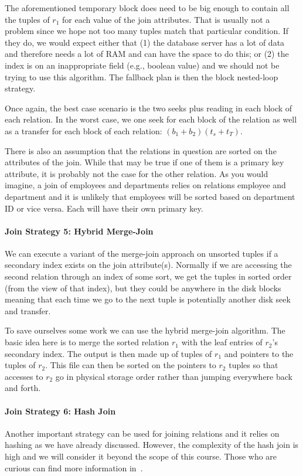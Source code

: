 The aforementioned temporary block does need to be big enough to contain all the tuples of $r_{1}$ for each value of the join attributes. That is usually not a problem since we hope not too many tuples match that particular condition. If they do, we would expect either that (1) the database server has a lot of data and therefore needs a lot of RAM and can have the space to do this; or (2) the index is on an inappropriate field (e.g., boolean value) and we should not be trying to use this algorithm. The fallback plan is then the block nested-loop strategy.

Once again, the best case scenario is the two seeks plus reading in each block of each relation. In the worst case, we one seek for each block of the relation as well as a transfer for each block of each relation: $(b_{1} + b_{2})(t_{s} + t_{T})$.

There is also an assumption that the relations in question are sorted on the attributes of the join. While that may be true if one of them is a primary key attribute, it is probably not the case for the other relation. As you would imagine, a join of employees and departments relies on relations employee and department and it is unlikely that employees will be sorted based on department ID or vice versa. Each will have their own primary key. 

\paragraph{Join Strategy 5: Hybrid Merge-Join}

We can execute a variant of the merge-join approach on unsorted tuples if a secondary index exists on the join attribute(s). Normally if we are accessing the second relation through an index of some sort, we get the tuples in sorted order (from the view of that index), but they could be anywhere in the disk blocks meaning that each time we go to the next tuple is potentially another disk seek and transfer.

To save ourselves some work we can use the hybrid merge-join algorithm. The basic idea here is to merge the sorted relation $r_{1}$ with the leaf entries of $r_{2}$'s secondary index. The output is then made up of tuples of $r_{1}$ and pointers to the tuples of $r_{2}$. This file can then be sorted on the pointers to $r_{2}$ tuples so that accesses to $r_{2}$ go in physical storage order rather than jumping everywhere back and forth.

\paragraph{Join Strategy 6: Hash Join}
Another important strategy can be used for joining relations and it relies on hashing as we have already discussed. However, the complexity of the hash join is high and we will consider it beyond the scope of this course. Those who are curious can find more information in~\cite{dsc}.


